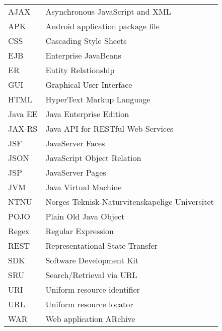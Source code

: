 \documentclass[../main.tex]{subfiles}
\begin{document}
\begin{tabular}{ p{2cm} l  }
AJAX	 & Asynchronous JavaScript and XML\\
APK & Android application package file\\
CSS & Cascading Style Sheets\\
EJB & Enterprise JavaBeans\\
ER & Entity Relationship\\
GUI & Graphical User Interface\\
HTML & HyperText Markup Language\\
Java EE & Java Enterprise Edition\\
JAX-RS & Java API for RESTful Web Services\\
JSF & JavaServer Faces\\
JSON & JavaScript Object Relation\\
JSP & JavaServer Pages\\
JVM & Java Virtual Machine\\
NTNU & Norges Teknisk-Naturvitenskapelige Universitet\\
POJO & Plain Old Java Object\\
Regex & Regular Expression\\
REST & Representational State Transfer\\
SDK & Software Development Kit\\
SRU & Search/Retrieval via URL\\
URI & Uniform resource identifier\\
URL & Uniform resource locator\\
WAR & Web application ARchive\\
\end{tabular}


\newpage
\end{document}

